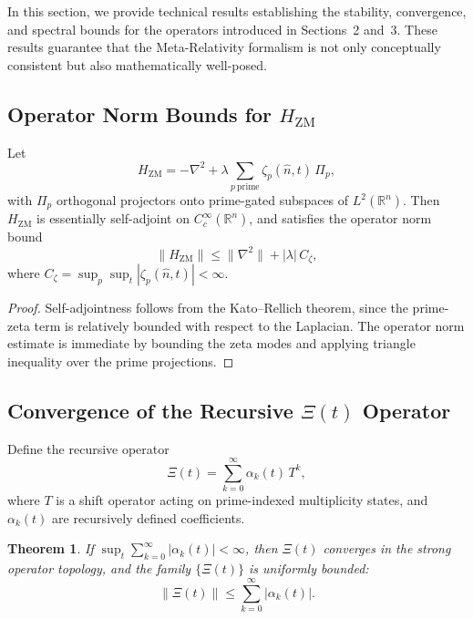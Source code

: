 \documentclass[12]{amsart}
\newtheorem{theorem}{Theorem}
\theoremstyle{plain}
\begin{document}
In this section, we provide technical results establishing the stability, convergence, and spectral bounds for the operators introduced in Sections~2 and~3. These results guarantee that the Meta-Relativity formalism is not only conceptually consistent but also mathematically well-posed.

\subsection{Operator Norm Bounds for $H_{\mathrm{ZM}}$}

\begin{proposition}
Let 
\begin{equation}
    H_{\mathrm{ZM}} = -\nabla^2 + \lambda \sum_{p \ \mathrm{prime}} \zeta_p(\hat{n},t)\, \Pi_p ,
\end{equation}
with $\Pi_p$ orthogonal projectors onto prime-gated subspaces of $L^2(\mathbb{R}^n)$.  
Then $H_{\mathrm{ZM}}$ is essentially self-adjoint on $C_c^\infty(\mathbb{R}^n)$, and satisfies the operator norm bound
\begin{equation}
    \| H_{\mathrm{ZM}} \| \leq \| \nabla^2 \| + |\lambda| \, C_\zeta ,
\end{equation}
where $C_\zeta = \sup_{p} \sup_{t} |\zeta_p(\hat{n},t)| < \infty$.
\end{proposition}

\begin{proof}
Self-adjointness follows from the Kato--Rellich theorem, since the prime-zeta term is relatively bounded with respect to the Laplacian. The operator norm estimate is immediate by bounding the zeta modes and applying triangle inequality over the prime projections.
\end{proof}

\subsection{Convergence of the Recursive $\Xi(t)$ Operator}

Define the recursive operator
\begin{equation}
    \Xi(t) = \sum_{k=0}^\infty \alpha_k(t) \, T^k ,
\end{equation}
where $T$ is a shift operator acting on prime-indexed multiplicity states, and $\alpha_k(t)$ are recursively defined coefficients.

\begin{theorem}
If $\sup_{t} \sum_{k=0}^\infty |\alpha_k(t)| < \infty$, then $\Xi(t)$ converges in the strong operator topology, and the family $\{ \Xi(t) \}$ is uniformly bounded:
\begin{equation}
    \| \Xi(t) \| \leq \sum_{k=0}^\infty |\alpha_k(t)| .
\end{equation}
\end{theorem}
\end{document}
